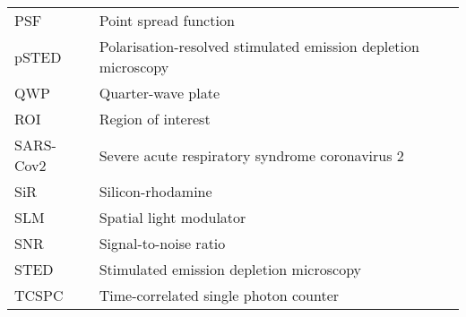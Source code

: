 \begin{tabular}{ll}
	PSF       & Point spread function                                               \\
	pSTED     & Polarisation-resolved stimulated emission depletion microscopy      \\
	QWP       & Quarter-wave plate                                                  \\
	ROI       & Region of interest                                                  \\
	SARS-Cov2 & Severe acute respiratory syndrome coronavirus 2                     \\
	SiR       & Silicon-rhodamine                                                   \\
	SLM       & Spatial light modulator                                             \\
	SNR       & Signal-to-noise ratio                                               \\
	STED      & Stimulated emission depletion  microscopy                           \\
	TCSPC     & Time-correlated single photon counter
\end{tabular}